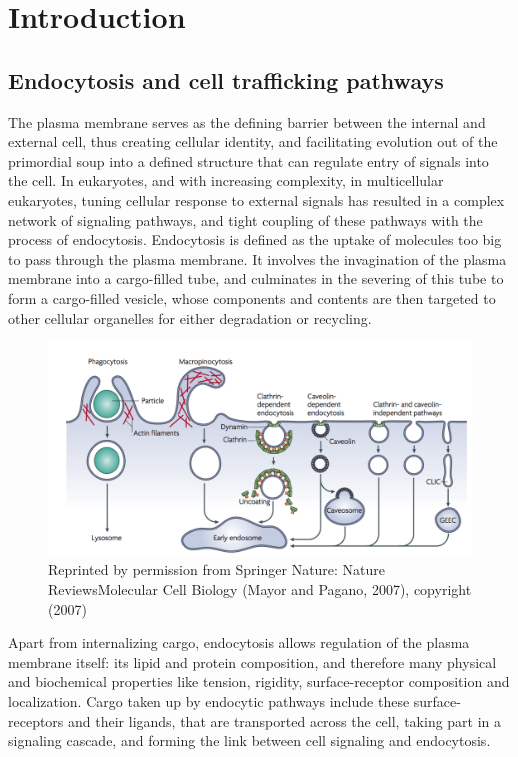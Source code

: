 \chapter{Introduction} %
\graphicspath{ {/Users/kaksonenlab/Desktop/figures/} }
\label{Ch:Intro} %

\section{Endocytosis and cell trafficking pathways}
The plasma membrane serves as the defining barrier between the internal and external cell, thus creating cellular identity, and facilitating evolution out of the primordial soup into a defined structure that can regulate entry of signals into the cell. In eukaryotes, and with increasing complexity, in multicellular eukaryotes, tuning cellular response to external signals has resulted in a complex network of signaling pathways, and tight coupling of these pathways with the process of endocytosis. Endocytosis is defined as the uptake of molecules too big to pass through the plasma membrane. It involves the invagination of the plasma membrane into a cargo-filled tube, and culminates in the severing of this tube to form a cargo-filled vesicle, whose components and contents are then targeted to other cellular organelles for either degradation or recycling. 

\begin{figure}[H]
	\centering
	\includegraphics[scale=0.4]{figures/intro/Fig1_mayor}
	\caption[Endocytic pathways in cells]
	{Reprinted by permission from Springer Nature: Nature ReviewsMolecular Cell Biology (Mayor and Pagano, 2007), copyright (2007)}
\end{figure}


Apart from internalizing cargo, endocytosis allows regulation of the plasma membrane itself: its lipid and protein composition, and therefore many physical and biochemical properties like tension, rigidity, surface-receptor composition and localization. Cargo taken up by endocytic pathways include these surface-receptors and their ligands, that are transported across the cell, taking part in a signaling cascade, and forming the link between cell signaling and endocytosis.


